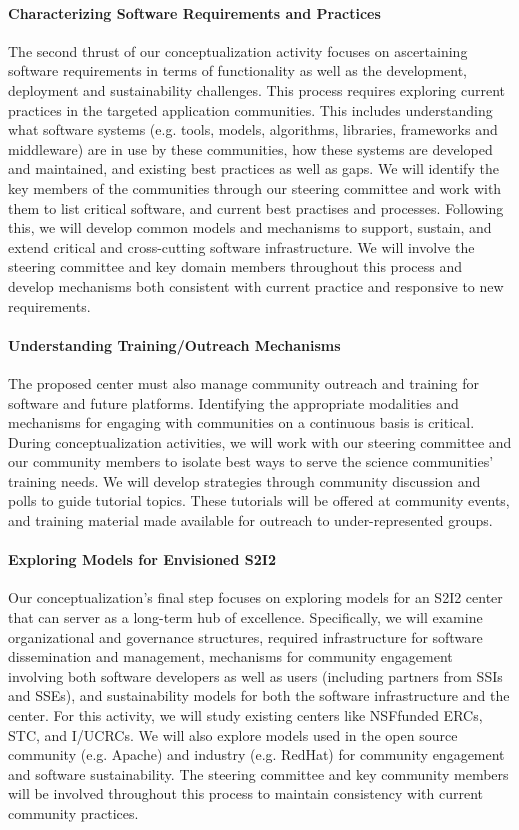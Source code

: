 \paragraph{Characterizing Software Requirements and Practices} The second thrust of our conceptualization
activity focuses on ascertaining software requirements in terms of functionality as well as the
development, deployment and sustainability challenges. This process requires exploring current
practices in the targeted application communities. This includes understanding what software
systems (e.g. tools, models, algorithms, libraries, frameworks and middleware) are in use by these
communities, how these systems are developed and maintained, and existing best practices as well
as gaps. We will identify the key members of the communities through our steering committee
and work with them to list critical software, and current best practises and processes. Following
this, we will develop common models and mechanisms to support, sustain, and extend critical
and cross-cutting software infrastructure. We will involve the steering committee and key domain
members throughout this process and develop mechanisms both consistent with current practice and
responsive to new requirements.

\paragraph{Understanding Training/Outreach Mechanisms} The proposed center must also manage community
outreach and training for software and future platforms. Identifying the appropriate modalities
and mechanisms for engaging with communities on a continuous basis is critical. During
conceptualization activities, we will work with our steering committee and our community members
to isolate best ways to serve the science communities’ training needs. We will develop strategies
through community discussion and polls to guide tutorial topics. These tutorials will be offered at
community events, and training material made available for outreach to under-represented groups.

\paragraph{Exploring Models for Envisioned S2I2} Our conceptualization’s final step focuses on exploring
models for an S2I2 center that can server as a long-term hub of excellence. Specifically, we will
examine organizational and governance structures, required infrastructure for software dissemination
and management, mechanisms for community engagement involving both software developers
as well as users (including partners from SSIs and SSEs), and sustainability models for both the
software infrastructure and the center. For this activity, we will study existing centers like NSFfunded
ERCs, STC, and I/UCRCs. We will also explore models used in the open source community
(e.g. Apache) and industry (e.g. RedHat) for community engagement and software sustainability.
The steering committee and key community members will be involved throughout this process to
maintain consistency with current community practices.

